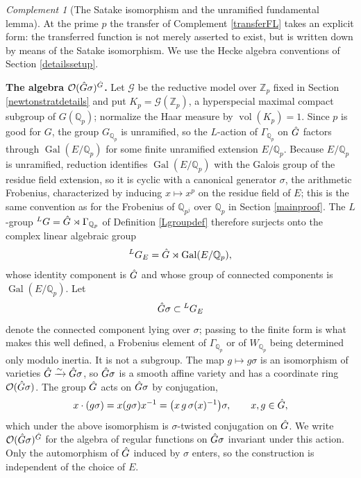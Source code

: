 \documentclass[11pt,a4paper]{article}
\theoremstyle{definition}
\theoremstyle{plain}
\theoremstyle{remark}
\newtheorem{Rc}[shared]{Complement}
\theoremstyle{plain}
\DeclareMathOperator{\vol}{vol}
\DeclareMathOperator{\Gal}{Gal}
\begin{document}
\begin{Rc}[The Satake isomorphism and the unramified fundamental lemma]\label{satakeFL}
    At the prime $p$ the transfer of Complement \ref{transferFL} takes an explicit form: the transferred function is not merely asserted to exist, but is written down by means of the Satake isomorphism. We use the Hecke algebra conventions of Section \ref{detailssetup}.

    \textbf{The algebra $\mathcal{O}(\Hat{G}\sigma)^{\Hat{G}}$.} Let $\mathcal{G}$ be the reductive model over $\mathbb{Z}_p$ fixed in Section \ref{newtonstratdetails} and put $K_p=\mathcal{G}(\mathbb{Z}_p)$, a hyperspecial maximal compact subgroup of $G(\mathbb{Q}_p)$; normalize the Haar measure by $\vol(K_p)=1$. Since $p$ is good for $G$, the group $G_{\mathbb{Q}_p}$ is unramified, so the $L$-action of $\Gamma_{\mathbb{Q}_p}$ on $\Hat{G}$ factors through $\Gal(E/\mathbb{Q}_p)$ for some finite unramified extension $E/\mathbb{Q}_p$. Because $E/\mathbb{Q}_p$ is unramified, reduction identifies $\Gal(E/\mathbb{Q}_p)$ with the Galois group of the residue field extension, so it is cyclic with a canonical generator $\sigma$, the arithmetic Frobenius, characterized by inducing $x\mapsto x^p$ on the residue field of $E$; this is the same convention as for the Frobenius of $\mathbb{Q}_{p^j}$ over $\mathbb{Q}_p$ in Section \ref{mainproof}. The $L$-group ${}^L G = \Hat{G}\rtimes\Gamma_{\mathbb{Q}_p}$ of Definition \ref{Lgroupdef} therefore surjects onto the complex linear algebraic group
    $${}^L G_E = \Hat{G}\rtimes\Gal(E/\mathbb{Q}_p),$$
    whose identity component is $\Hat{G}$ and whose group of connected components is $\Gal(E/\mathbb{Q}_p)$. Let
    $$\Hat{G}\sigma \subset {}^L G_E$$
    denote the connected component lying over $\sigma$; passing to the finite form is what makes this well defined, a Frobenius element of $\Gamma_{\mathbb{Q}_p}$ or of $W_{\mathbb{Q}_p}$ being determined only modulo inertia. It is not a subgroup. The map $g\mapsto g\sigma$ is an isomorphism of varieties $\Hat{G}\xrightarrow{\sim}\Hat{G}\sigma$, so $\Hat{G}\sigma$ is a smooth affine variety and has a coordinate ring $\mathcal{O}(\Hat{G}\sigma)$. The group $\Hat{G}$ acts on $\Hat{G}\sigma$ by conjugation,
    $$x\cdot(g\sigma)=x(g\sigma)x^{-1}=\bigl(x\,g\,\sigma(x)^{-1}\bigr)\sigma, \qquad x,g\in\Hat{G},$$
    which under the above isomorphism is $\sigma$-twisted conjugation on $\Hat{G}$. We write $\mathcal{O}(\Hat{G}\sigma)^{\Hat{G}}$ for the algebra of regular functions on $\Hat{G}\sigma$ invariant under this action. Only the automorphism of $\Hat{G}$ induced by $\sigma$ enters, so the construction is independent of the choice of $E$.


\end{Rc}
\end{document}
